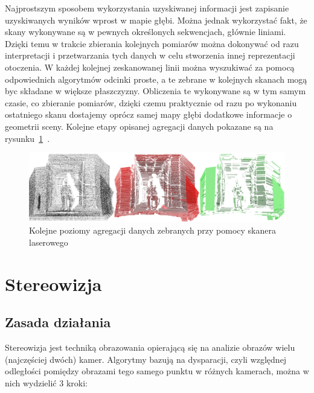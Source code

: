 Najprostszym sposobem wykorzystania uzyskiwanej informacji jest zapisanie
uzyskiwanych wyników wprost w mapie głębi. Można jednak wykorzystać fakt, że
skany wykonywane są w pewnych określonych sekwencjach, głównie liniami. Dzięki
temu w trakcie zbierania kolejnych pomiarów można dokonywać od razu
interpretacji i przetwarzania tych danych w celu stworzenia innej reprezentacji
otoczenia. W każdej kolejnej zeskanowanej linii można wyszukiwać za pomocą
odpowiednich algorytmów odcinki proste, a te zebrane w kolejnych skanach mogą
byc składane w większe płaszczyzny. Obliczenia te wykonywane są w tym samym
czasie, co zbieranie pomiarów, dzięki czemu praktycznie od razu po wykonaniu
ostatniego skanu dostajemy oprócz samej mapy głębi dodatkowe informacje o
geometrii sceny. Kolejne etapy opisanej agregacji danych
pokazane są na rysunku~\ref{fig:laser_aggregate}~\cite{Surmann01a3d}.

\begin{figure}[h!]
\centering
\includegraphics[width=12cm]{../../Common/img/laser_aggregate}
\caption{Kolejne poziomy agregacji danych zebranych przy pomocy skanera
laserowego}
\label{fig:laser_aggregate}
\end{figure}

\section{Stereowizja}

\subsection{Zasada działania}

Stereowizja jest techniką obrazowania opierającą się na analizie obrazów wielu
(najczęściej dwóch) kamer. Algorytmy bazują na dysparacji, czyli względnej
odległości pomiędzy obrazami tego samego punktu w różnych kamerach, można w
nich wydzielić 3 kroki:

